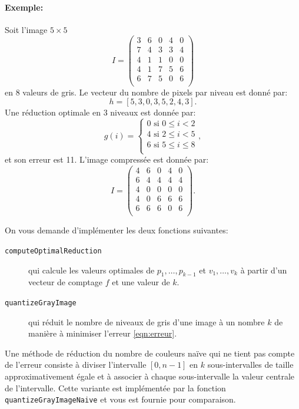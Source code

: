 \documentclass[a4paper,10pt]{article}
\begin{document}
\paragraph{Exemple:} Soit l'image $5\times 5$
$$I=\left(\begin{matrix}
     3 & 6 & 0 & 4 & 0\\
     7 & 4 & 3 & 3 & 4\\
     4 & 1 & 1 & 0 & 0\\
     4 & 1 & 7 & 5 & 6\\
     6 & 7 & 5 & 0 & 6\\
\end{matrix}\right)
$$
en 8 valeurs de gris. Le vecteur du nombre de pixels par niveau est donné par:
$$h=[5,3,0,3,5,2,4,3].$$ Une réduction optimale en 3 niveaux est donnée par:
\[g(i)=\left\{
\begin{array}{ll}
0\mbox{ si }0\leq i<2\\
4\mbox{ si }2\leq i < 5\\
6\mbox{ si }5\leq i\leq 8\\
\end{array}
\right.,
\]
et son erreur est 11. L'image compressée est donnée par:
$$
\hat{I}=\left(\begin{matrix}
  4 & 6 & 0 & 4 & 0\\
  6 & 4 & 4 & 4 & 4\\
  4 & 0 & 0 & 0 & 0\\
  4 & 0 & 6 & 6 & 6\\
  6 & 6 & 6 & 0 & 6\\
\end{matrix}\right).
$$


On vous demande d'implémenter les deux fonctions suivantes:
\begin{description}
\item[\texttt{computeOptimalReduction}] qui calcule les valeurs optimales de $p_1,\ldots,p_{k-1}$ et $v_1,\ldots,v_k$ à partir d'un vecteur de comptage $f$ et une valeur de $k$.
\item[\texttt{quantizeGrayImage}] qui réduit le nombre de niveaux de gris d'une image à un nombre $k$ de manière à minimiser l'erreur \ref{eqn:erreur}.
\end{description}

Une méthode de réduction du nombre de couleurs naïve qui ne tient pas
compte de l'erreur consiste à diviser l'intervalle $[0,n-1]$ en $k$
sous-intervalles de taille approximativement égale et à associer à
chaque sous-intervalle la valeur centrale de l'intervalle. Cette
variante est implémentée par la fonction
\texttt{quantizeGrayImageNaive} et vous est fournie pour comparaison.
\end{document}
